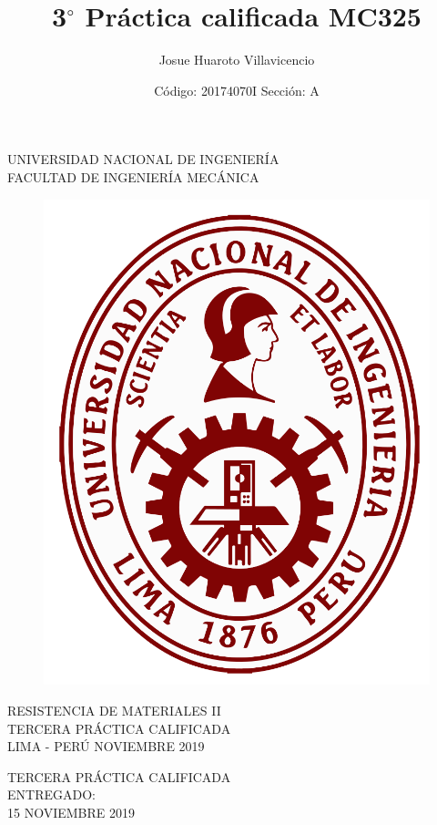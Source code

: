 \documentclass[a4paper,11pt]{report}
\author{Josue Huaroto Villavicencio}
\date{Código: 20174070I \hspace{90pt} Sección: A}
\title{3$^{\circ}$ Práctica calificada MC325}
\begin{document}
\setcounter{page}{1}
\thispagestyle{empty}
\begin{center}
{\huge UNIVERSIDAD NACIONAL DE INGENIERÍA}\\[0.9cm]
{\Large FACULTAD DE INGENIERÍA MECÁNICA}\\[0.6in]
\end{center}
\begin{figure}[h]
\begin{center}
\includegraphics[scale=0.33]{logoUNI.png}
\vspace{0cm}
\end{center}
\end{figure}
\vspace{0.5cm}
\begin{center}
RESISTENCIA DE MATERIALES II\\[14mm]
{\large TERCERA PRÁCTICA CALIFICADA}\\[10mm]
\vfill
LIMA - PERÚ \hfill NOVIEMBRE 2019
\end{center}
\newpage
\thispagestyle{empty}
\begin{center}
{\Huge TERCERA PRÁCTICA CALIFICADA}\\[0.7cm]
\small ENTREGADO:\\[0.3cm]
\small 15 NOVIEMBRE 2019\\[2.9cm]
\end{center}
\end{document}
